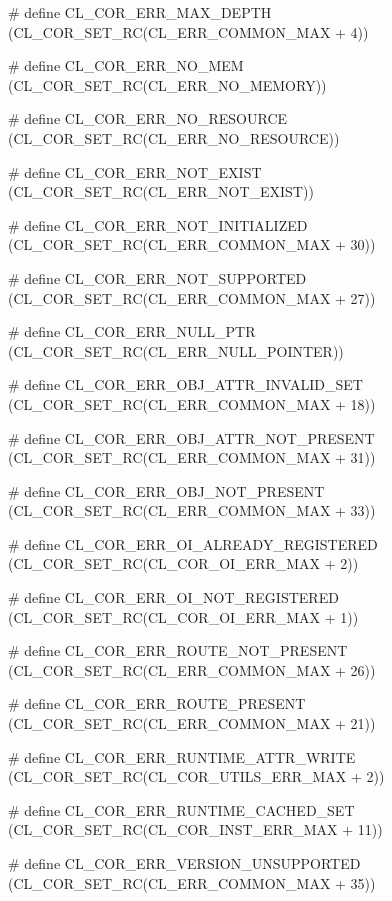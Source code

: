 \begin{flushleft}
\begin{CompactItemize}
\item \# define CL\_\-COR\_\-ERR\_\-MAX\_\-DEPTH (CL\_\-COR\_\-SET\_\-RC(CL\_\-ERR\_\-COMMON\_\-MAX + 4)) 
\item \# define CL\_\-COR\_\-ERR\_\-NO\_\-MEM (CL\_\-COR\_\-SET\_\-RC(CL\_\-ERR\_\-NO\_\-MEMORY)) 
\item \# define CL\_\-COR\_\-ERR\_\-NO\_\-RESOURCE (CL\_\-COR\_\-SET\_\-RC(CL\_\-ERR\_\-NO\_\-RESOURCE)) 
\item \# define CL\_\-COR\_\-ERR\_\-NOT\_\-EXIST (CL\_\-COR\_\-SET\_\-RC(CL\_\-ERR\_\-NOT\_\-EXIST)) 
\item \# define CL\_\-COR\_\-ERR\_\-NOT\_\-INITIALIZED (CL\_\-COR\_\-SET\_\-RC(CL\_\-ERR\_\-COMMON\_\-MAX + 30)) 
\item \# define CL\_\-COR\_\-ERR\_\-NOT\_\-SUPPORTED (CL\_\-COR\_\-SET\_\-RC(CL\_\-ERR\_\-COMMON\_\-MAX + 27)) 
\item \# define CL\_\-COR\_\-ERR\_\-NULL\_\-PTR (CL\_\-COR\_\-SET\_\-RC(CL\_\-ERR\_\-NULL\_\-POINTER)) 
\item \# define CL\_\-COR\_\-ERR\_\-OBJ\_\-ATTR\_\-INVALID\_\-SET (CL\_\-COR\_\-SET\_\-RC(CL\_\-ERR\_\-COMMON\_\-MAX + 18)) 
\item \# define CL\_\-COR\_\-ERR\_\-OBJ\_\-ATTR\_\-NOT\_\-PRESENT (CL\_\-COR\_\-SET\_\-RC(CL\_\-ERR\_\-COMMON\_\-MAX + 31)) 
\item \# define CL\_\-COR\_\-ERR\_\-OBJ\_\-NOT\_\-PRESENT (CL\_\-COR\_\-SET\_\-RC(CL\_\-ERR\_\-COMMON\_\-MAX + 33)) 
\item \# define CL\_\-COR\_\-ERR\_\-OI\_\-ALREADY\_\-REGISTERED (CL\_\-COR\_\-SET\_\-RC(CL\_\-COR\_\-OI\_\-ERR\_\-MAX + 2)) 
\item \# define CL\_\-COR\_\-ERR\_\-OI\_\-NOT\_\-REGISTERED (CL\_\-COR\_\-SET\_\-RC(CL\_\-COR\_\-OI\_\-ERR\_\-MAX + 1)) 
\item \# define CL\_\-COR\_\-ERR\_\-ROUTE\_\-NOT\_\-PRESENT (CL\_\-COR\_\-SET\_\-RC(CL\_\-ERR\_\-COMMON\_\-MAX + 26)) 
\item \# define CL\_\-COR\_\-ERR\_\-ROUTE\_\-PRESENT (CL\_\-COR\_\-SET\_\-RC(CL\_\-ERR\_\-COMMON\_\-MAX + 21)) 
\item \# define CL\_\-COR\_\-ERR\_\-RUNTIME\_\-ATTR\_\-WRITE (CL\_\-COR\_\-SET\_\-RC(CL\_\-COR\_\-UTILS\_\-ERR\_\-MAX + 2)) 
\item \# define CL\_\-COR\_\-ERR\_\-RUNTIME\_\-CACHED\_\-SET (CL\_\-COR\_\-SET\_\-RC(CL\_\-COR\_\-INST\_\-ERR\_\-MAX + 11)) 
\item \# define CL\_\-COR\_\-ERR\_\-VERSION\_\-UNSUPPORTED (CL\_\-COR\_\-SET\_\-RC(CL\_\-ERR\_\-COMMON\_\-MAX + 35)) 

\end{CompactItemize}
\end{flushleft}
